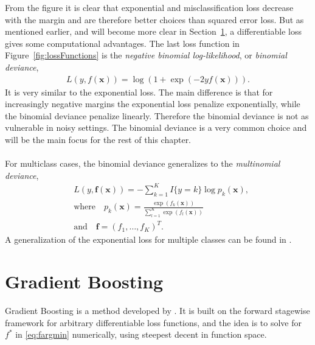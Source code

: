 From the figure it is clear that exponential and misclassification loss decrease with the margin and are therefore better choices than squared error loss. But as mentioned earlier, and will become more clear in Section~\ref{sec:Gradient Boosting}, a differentiable loss gives some computational advantages. The last loss function in Figure~\ref{fig:lossFunctions} is the \textit{negative binomial log-likelihood}, or \textit{binomial deviance},
\begin{align}
  L(y, f(\mathbf{x})) = \log \left( 1 + \exp (-2 y f(\mathbf{x})) \right).
\end{align}
It is very similar to the exponential loss. The main difference is that for increasingly negative margins the exponential loss penalize exponentially, while the binomial deviance penalize linearly. Therefore the binomial deviance is not as vulnerable in noisy settings. The binomial deviance is a very common choice and will be the main focus for the rest of this chapter. 
\\
\\
For multiclass cases, the binomial deviance generalizes to the \textit{multinomial deviance},
\begin{align}
  \label{eq:multinomialDeviance} 
  &L(y, \mathbf{f}( \mathbf{x })) = - \sum^{K}_{k=1} I\{y = k\} \log p_k(\mathbf{x}), \\
  \label{eq:multinomialDevianceProb} 
  &\text{where} \quad p_k(\mathbf{x}) = \frac{\exp (f_k(\mathbf{x}))}{\sum^{K}_{l=1} \exp (f_l(\mathbf{x}))}\\
  &\text{and} \quad \mathbf{f} = (f_1, \ldots, f_K)^T.
\end{align}
A generalization of the exponential loss for multiple classes can be found in \cite{zhu2009}.
\section{Gradient Boosting}
\label{sec:Gradient Boosting}
Gradient Boosting is a method developed by \cite{friedman}. It is built on the forward stagewise framework for arbitrary differentiable loss functions, and the idea is to solve for $f^*$ in \eqref{eq:fargmin} numerically, using steepest decent in function space.

